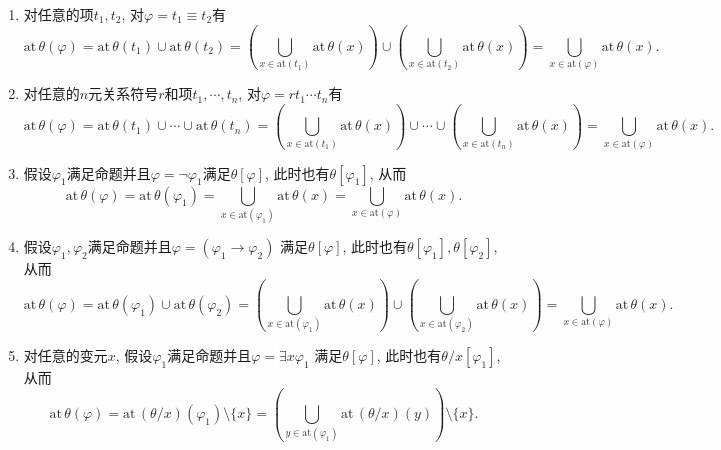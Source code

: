\documentclass[UTF8]{ctexart}
\begin{document}
\begin{enumerate}
    \item 对任意的项$t_1,t_2$, 对$\varphi=t_1\equiv t_2$有
    \[
        \mathrm{at}\,\theta(\varphi)=
        \mathrm{at}\,\theta(t_1)\cup\mathrm{at}\,\theta(t_2)=
        \left(\bigcup_{x\in\mathrm{at}(t_1)}\mathrm{at}\,\theta(x)\right)\cup
        \left(\bigcup_{x\in\mathrm{at}(t_2)}\mathrm{at}\,\theta(x)\right)=
        \bigcup_{x\in\mathrm{at}(\varphi)}\mathrm{at}\,\theta(x).
    \]

    \vspace{3pt}
    \item 对任意的$n$元关系符号$r$和项$t_1,\cdots,t_n$, 对$\varphi=rt_1\cdots t_n$有
    \vspace{3pt}
    \[
        \mathrm{at}\,\theta(\varphi)=
        \mathrm{at}\,\theta(t_1)\cup\cdots\cup\mathrm{at}\,\theta(t_n)=
        \left(\bigcup_{x\in\mathrm{at}(t_1)}\mathrm{at}\,\theta(x)\right)\cup\cdots
        \cup\left(\bigcup_{x\in\mathrm{at}(t_n)}\mathrm{at}\,\theta(x)\right)=
        \bigcup_{x\in\mathrm{at}(\varphi)}\mathrm{at}\,\theta(x).
    \]
    
    \vspace{3pt}
    \item 假设$\varphi_1$满足命题并且$\varphi=\neg\varphi_1$满足$\theta[\varphi]$,
    此时也有$\theta[\varphi_1]$, 从而
    \vspace{3pt}
    \[
        \mathrm{at}\,\theta(\varphi)=\mathrm{at}\,\theta(\varphi_1)=
        \bigcup_{x\in\mathrm{at}(\varphi_1)}\mathrm{at}\,\theta(x)=
        \bigcup_{x\in\mathrm{at}(\varphi)}\mathrm{at}\,\theta(x).
    \]

    \vspace{3pt}
    \item 假设$\varphi_1,\varphi_2$满足命题并且$\varphi=(\varphi_1\to\varphi_2)$
    满足$\theta[\varphi]$, 此时也有$\theta[\varphi_1],\theta[\varphi_2]$, 从而
    \[
        \mathrm{at}\,\theta(\varphi)=
        \mathrm{at}\,\theta(\varphi_1)\cup\mathrm{at}\,\theta(\varphi_2)=
        \left(\bigcup_{x\in\mathrm{at}(\varphi_1)}\mathrm{at}\,\theta(x)\right)\cup
        \left(\bigcup_{x\in\mathrm{at}(\varphi_2)}\mathrm{at}\,\theta(x)\right)=
        \bigcup_{x\in\mathrm{at}(\varphi)}\mathrm{at}\,\theta(x).
    \]

    \vspace{3pt}
    \item 对任意的变元$x$, 假设$\varphi_1$满足命题并且$\varphi=\exists x\varphi_1$
    满足$\theta[\varphi]$, 此时也有$\theta/x[\varphi_1]$, 从而
    \[
        \mathrm{at}\,\theta(\varphi)=
        \mathrm{at}\,(\theta/x)(\varphi_1)\setminus\{x\}=
        \left(\bigcup_{y\in\mathrm{at}(\varphi_1)}\mathrm{at}\,(\theta/x)(y)\right)
        \setminus\{x\}.
    \]


\end{enumerate}
\end{document}
